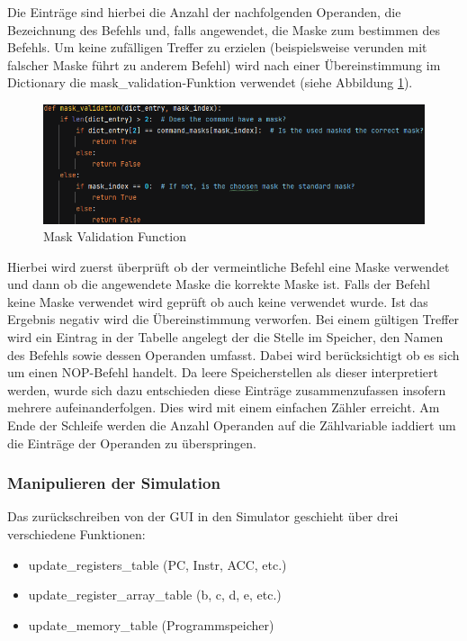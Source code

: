 \documentclass[12pt]{article}
\newcommand{\imgSpaceBefore}{\vspace{10pt}}
\begin{document}
\noindent
Die Einträge sind hierbei die Anzahl der nachfolgenden Operanden, die Bezeichnung des Befehls und, falls angewendet, die Maske zum bestimmen des Befehls. Um keine zufälligen Treffer zu erzielen (beispielsweise verunden mit falscher Maske führt zu anderem Befehl) wird nach einer Übereinstimmung im Dictionary die \glqq mask\_validation\grqq-Funktion verwendet (siehe Abbildung \ref{fig:MaskValid}).\imgSpaceBefore

\begin{figure}[H]
\centering
\includegraphics[width=14cm]{bilder/mask_valid}
\caption{Mask Validation Function}
\label{fig:MaskValid}
\end{figure}

\noindent
Hierbei wird zuerst überprüft ob der vermeintliche Befehl eine Maske verwendet und dann ob die angewendete Maske die korrekte Maske ist. Falls der Befehl keine Maske verwendet wird geprüft ob auch keine verwendet wurde. Ist das Ergebnis negativ wird die Übereinstimmung verworfen. Bei einem gültigen Treffer wird ein Eintrag in der Tabelle angelegt der die Stelle im Speicher, den Namen des Befehls sowie dessen Operanden umfasst. Dabei wird berücksichtigt ob es sich um einen NOP-Befehl handelt. Da leere Speicherstellen als dieser interpretiert werden, wurde sich dazu entschieden diese Einträge zusammenzufassen insofern mehrere aufeinanderfolgen. Dies wird mit einem einfachen Zähler erreicht. Am Ende der Schleife werden die Anzahl Operanden auf die Zählvariable \glqq i\grqq addiert um die Einträge der Operanden zu überspringen.

\subsubsection{Manipulieren der Simulation}
Das zurückschreiben von der GUI in den Simulator geschieht über drei verschiedene Funktionen:\imgSpaceBefore

\begin{itemize}
	\item update\_registers\_table (PC, Instr, ACC, etc.)
	\item update\_register\_array\_table (b, c, d, e, etc.)
	\item update\_memory\_table (Programmspeicher)
\end{itemize}
\end{document}
